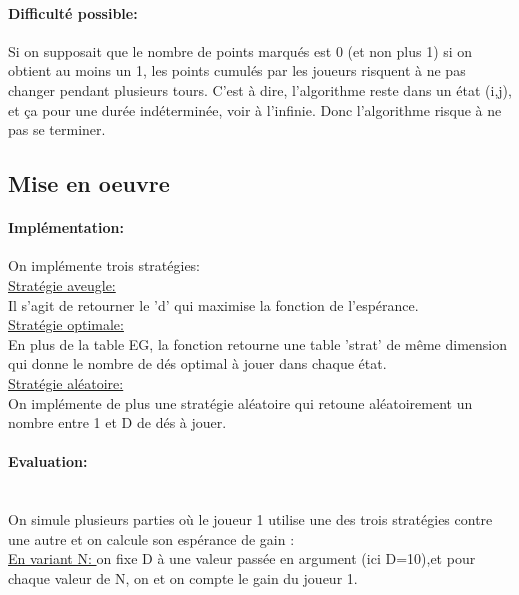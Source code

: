\documentclass{article}
\begin{document}
\begin{large}
        \paragraph{Difficulté possible: }
        Si on supposait que le nombre de points marqués est 0 (et non plus 1) si on obtient au moins un 1, 
        les points cumulés par les joueurs risquent à ne pas changer pendant plusieurs tours. C'est à dire,
        l'algorithme reste dans un état (i,j), et ça pour une durée indéterminée, voir à l'infinie. Donc l'algorithme risque à ne pas se terminer.
        
        \subsection{Mise en oeuvre}
        \paragraph{Implémentation: }
        On implémente trois stratégies: \\
        \underline{Stratégie aveugle:}\\
        Il s'agit de retourner le 'd' qui maximise la fonction de l'espérance.\\
        \underline{Stratégie optimale:}\\
        En plus de la table EG, la fonction retourne une table 'strat' de même dimension qui donne 
        le nombre de dés optimal à jouer dans chaque état.\\ 
        \underline{Stratégie aléatoire:}\\
        On implémente de plus une stratégie aléatoire qui retoune aléatoirement un nombre entre 1 et D de dés à jouer. \\
        \paragraph{Evaluation: }\\
        On simule plusieurs parties où le joueur 1 utilise une des trois stratégies contre une autre et on calcule son espérance de gain :\\
        \underline{En variant N: } on fixe D à une valeur passée en argument (ici D=10),et pour 
        chaque valeur de N, on  et on compte le gain du joueur 1.\\ 
        

\end{large}
\end{document}
